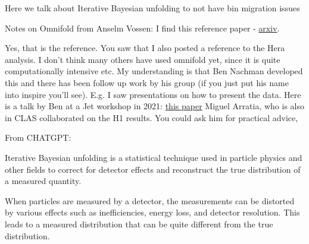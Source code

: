     
    Here we talk about Iterative Bayesian unfolding to not have bin migration issues
    
    Notes on Omnifold from Anselm Vossen:
    I find this reference paper - \href{https://arxiv.org/pdf/1911.09107.pdf}{arxiv}.
    
    

    
    
        
   
    
    
    
    Yes, that is the reference. You saw that I also posted a reference to the Hera analysis. I don’t think many others have used omnifold yet, since it is quite computationally intensive etc.
    My understanding is that Ben Nachman developed this and there has been follow up work by his group (if you just put his name into inspire you’ll see). E.g. I saw presentations on how to present the data. Here is a talk by Ben at a Jet workshop in 2021: \href{https://indico.bnl.gov/event/10555/contributions/54721/attachments/37368/61570/H1Measurement_EICWorkshopSeptember2021.pdf}{this paper}
     Miguel Arratia, who is also in CLAS collaborated on the H1 results. You could ask him for practical advice,
    
    From CHATGPT:
    
    
    Iterative Bayesian unfolding is a statistical technique used in particle physics and other fields to correct for detector effects and reconstruct the true distribution of a measured quantity.
    
    When particles are measured by a detector, the measurements can be distorted by various effects such as inefficiencies, energy loss, and detector resolution. This leads to a measured distribution that can be quite different from the true distribution.
    
